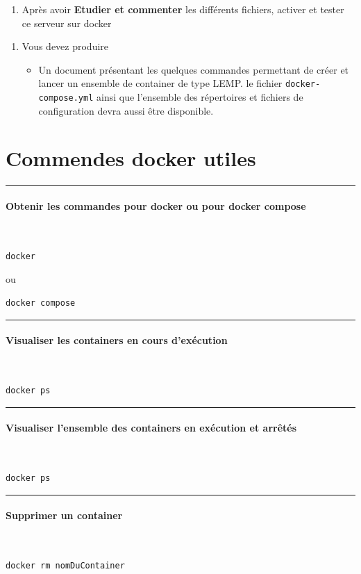 \documentclass[french, 12pt]{article}%
\newcommand{\itemE}{\item[$\bullet$]}
\newcommand{\paraL}[1]{\tiny\noindent\rule{1.0\linewidth}{0.5pt}\paragraph*{#1}\  \normalsize}
\begin{document}
\begin{enumerate}
\item Après avoir \textbf{Etudier et commenter} les différents fichiers, activer et tester ce serveur sur docker 
\end{enumerate}



\begin{enumerate}[resume]
\item Vous devez produire
	\begin{itemize}
	\itemE Un document présentant les quelques commandes permettant de créer et lancer un ensemble de container de type LEMP. le fichier \verb?docker-compose.yml? ainsi que l'ensemble des répertoires et fichiers de configuration devra aussi être disponible. 	
	\end{itemize}

\end{enumerate}

\appendix
\newpage
\section{Commendes docker utiles}
\label{lbl_CommandeUtiles}


\paraL{Obtenir les commandes pour docker ou pour docker compose}
\begin{lstlisting}[style=commande]
docker 
\end{lstlisting}

ou 

\begin{lstlisting}[style=commande]
docker compose 
\end{lstlisting}

\paraL{Visualiser les containers en cours d'exécution}

\begin{lstlisting}[style=commande]
docker ps
\end{lstlisting}


\paraL{Visualiser l'ensemble des containers en exécution et arrêtés}

\begin{lstlisting}[style=commande]
docker ps
\end{lstlisting}


\paraL{Supprimer un container}

\begin{lstlisting}[style=commande]
docker rm nomDuContainer
\end{lstlisting}
\end{document}
